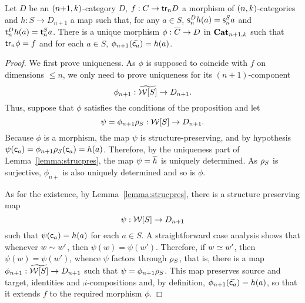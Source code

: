 \begin{proposition}\label{prop:univprop}
   Let $D$ be an  $(n{+}1,k)$-category $D$, $f:C\to\mathsf{tr}_{n} D$ a
   morphism of $(n,k)$-categories
   and  $h:S\to D_{n+1}$ a map such that, for any $a\in S$, $\mathsf{s}_{n}^Dh(a)=\mathsf{s}_{n}^S a$
    and $\mathsf{t}_{n}^D h(a)=\mathsf{t}_{n}^S a$.  There is a unique
    morphism $\phi:\overline{C}\to D$ in $\mathbf{Cat}_{n+1,k}$ such that $\mathsf{tr}_{n}\phi=f$ and for each $a\in S$, $\phi_{n+1}(\widetilde{\mathsf{c}_{a}})=h(a)$.
  \end{proposition}
  \begin{proof}
We first prove uniqueness. As $\phi$ is supposed to coincide with $f$ on
dimensions $\leq n$, we only need to prove uniqueness for its
$(n{+}1)$-component
\[\phi_{n+1}:\widetilde{\mathcal{W}[S]}\to D_{n+1}.\]
 Thus, suppose
that $\phi$ satisfies the conditions of the proposition and let
\[\psi=\phi_{n+1} \rho_{S}:\mathcal{W}[S]\to D_{n+1}.\]
   Because $\phi$ is a morphism, the  map $\psi$ is
   structure-preserving, and by hypothesis $\psi(\mathsf{c}_{a})=\phi_{n+1}\rho_{S}(\mathsf{c}_{a})=h(a)$. Therefore, by the uniqueness
   part of
   Lemma~\ref{lemma:strucpres}, the map $\psi=\overline{h}$ is uniquely determined.
As $\rho_{S}$  is surjective,
  $\phi_{n+}$ is also uniquely determined and so is $\phi$.

  As for the existence, by Lemma~\ref{lemma:strucpres}, there is a
  structure preserving map
  \[\psi:\mathcal{W}[S]\to D_{n+1}\]
  such that $\psi(\mathsf{c}_{a})=h(a)$ for each $a\in S$. 
  A straightforward case analysis shows that whenever $w\sim w'$,
  then $\psi(w)=\psi(w')$. Therefore, if $w\simeq w'$, then
  $\psi(w)=\psi(w')$, whence $\psi$ factors through $\rho_{S}$, that
  is, there is a map $\phi_{n+1}:\widetilde{\mathcal{W}[S]}\to D_{n+1}$ such that
  $\psi=\phi_{n+1}\rho_{S}$. This map preserves source and target,
  identities and $\comp i$-compositions and, by definition, $\phi_{n+1}(\widetilde{\mathsf{c}_{a}})=h(a)$, so that it extends $f$ to the required morphism $\phi$. 
\end{proof}
